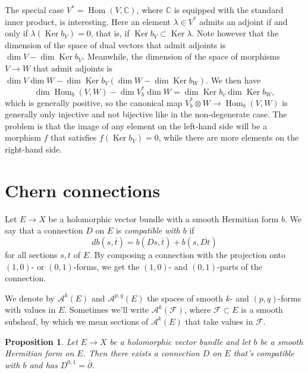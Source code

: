 \documentclass[10pt,a4paper]{amsart}
\newtheorem{prop}[theo]{Proposition}
\theoremstyle{definition}
\newcommand{\kk}[1]{\mathbb{#1}}
\newcommand{\cc}[1]{\mathcal{#1}}
\def\ov#1{\overline{#1}}
\DeclareMathOperator{\Ker}{Ker}
\DeclareMathOperator{\Hom}{Hom}
\begin{document}
The special case $V^* = \Hom(V, \kk C)$, where $\kk C$ is equipped with the
standard inner product, is interesting.
Here an element $\lambda \in V^*$ admits an adjoint if and only if $\lambda(\Ker b_V)
= 0$, that is, if $\Ker b_V \subset \Ker \lambda$.
Note however that the dimension of the space of dual vectors that admit adjoints
is $\dim V - \dim \Ker b_V$.
Meanwhile, the dimension of the space of morphisms $V \to W$ that admit adjoints
is $\dim V \dim W - \dim \Ker b_V (\dim W - \dim \Ker b_W)$.
We then have
$$
\dim \Hom_b(V, W)
- \dim V^*_b \dim W
= \dim \Ker b_v \dim \Ker b_W,
$$
which is generally positive, so the canonical map $V_b^* \otimes W \to \Hom_b(V,
W)$ is generally only injective and not bijective like in the non-degenerate
case.
The problem is that the image of any element on the left-hand side will be a
morphism $f$ that satisfies $f(\Ker b_V) = 0$, while there are more elements on
the right-hand side.


\section{Chern connections}
\label{sec:degenerate-chern-connections}



Let $E \to X$ be a holomorphic vector bundle with a smooth Hermitian form $b$. We say that a connection $D$ on $E$ is \emph{compatible with $b$} if
\[
d b(s, \ov t) = b(Ds, \ov t) + b(s, \ov{Dt})
\]
for all sections $s, t$ of $E$. By composing a connection with the projection onto $(1,0)$- or $(0,1)$-forms, we get the $(1,0)$- and $(0,1)$-parts of the connection.

We denote by $\cc A^k(E)$ and $\cc A^{p,q}(E)$ the spaces of smooth $k$- and $(p,q)$-forms with values in $E$.
Sometimes we'll write $\cc A^k(\cc F)$, where $\cc F \subset E$ is a smooth subsheaf, by which we mean sections of $\cc A^k(E)$ that take values in $\cc F$.


\begin{prop}
Let $E \to X$ be a holomorphic vector bundle and let $b$ be a smooth Hermitian form on $E$. Then there exists a connection $D$ on $E$ that's compatible with $b$ and has $D^{0,1} = \bar\partial$.
\end{prop}
\end{document}
